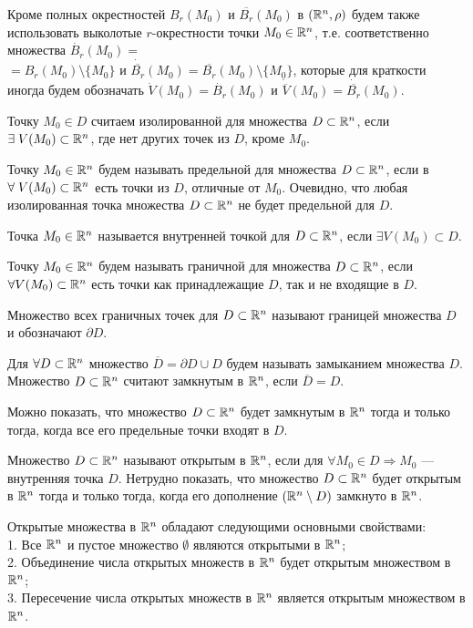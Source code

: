\begin{note}
	Кроме полных окрестностей $B_r(M_0)$ и $\overline{B_r}(M_0)$ в $(\mathbb{R}^n, \rho)$ будем также использовать выколотые $r$-окрестности точки $M_0 \in \mathbb{R}^n$, т.е. соответственно множества $\dot{B_r}(M_0) = $\\
	$ = B_r(M_0) \setminus \{M_0\}$ и $\dot{\overline{B_r}}(M_0) = \overline{B_r}(M_0) \setminus \{M_0\}$, которые для краткости иногда будем обозначать $\dot{V}(M_0) = \dot{B_r}(M_0)$ и $\dot{\overline{V}}(M_0) =\dot{\overline{B_r}}(M_0)$.
	
	Точку $M_0 \in D$ считаем изолированной для множества $D \subset \mathbb{R}^n$, если $ \exists \; V (M_0) \subset \mathbb{R}^n $, где нет других точек из $D$, кроме $M_0$.
	
	Точку $M_0 \in \mathbb{R}^n$ будем называть предельной для множества $D \subset \mathbb{R}^n$, если в $\forall \; V (M_0) \subset \mathbb{R}^n$ есть точки из $D$, отличные от $M_0$. Очевидно, что любая изолированная точка множества $D \subset \mathbb{R}^n$ не будет предельной для $D$.
	
	Точка $M_0 \in \mathbb{R}^n$ называется внутренней точкой для $D \subset \mathbb{R}^n$, если $\exists V (M_0) \subset D$.
	
	Точку $M_0 \in \mathbb{R}^n$ будем называть граничной для множества $D \subset \mathbb{R}^n$, если $\forall V (M_0) \subset \mathbb{R}^n$ есть точки как принадлежащие $D$, так и не входящие в $D$.
	
	Множество всех граничных точек для $D \subset \mathbb{R}^n$ называют границей множества $D$ и обозначают $\partial D$.
    
	Для $\forall D \subset \mathbb{R}^n$ множество $\overline{D} = \partial D \cup D$ будем называть замыканием множества $D$. Множество $D \subset \mathbb{R}^n$ считают замкнутым в $\mathbb{R}^n$, если $\overline{D} = D$.
\end{note}

Можно показать, что множество $D \subset \mathbb{R}^n$ будет замкнутым в $\mathbb{R}^n$ тогда и только тогда, когда все его предельные точки входят в $D$.

Множество $D \subset \mathbb{R}^n$ называют открытым в $\mathbb{R}^n$, если для $\forall M_0 \in D \Rightarrow M_0$ —  внутренняя точка $D$. Нетрудно показать, что множество $D \subset \mathbb{R}^n$ будет открытым в $\mathbb{R}^n$ тогда и только тогда, когда его дополнение $\left( \mathbb{R}^n \setminus D \right)$ замкнуто в $\mathbb{R}^n$.
	

Открытые множества в $\mathbb{R}^n$ обладают следующими основными свойствами:\\
1. Все $\mathbb{R}^n$ и пустое множество $\emptyset$ являются открытыми в $\mathbb{R}^n$;\\
2. Объединение  числа открытых множеств в $\mathbb{R}^n$ будет открытым множеством в $\mathbb{R}^n$;\\
3. Пересечение  числа открытых множеств в $\mathbb{R}^n$ является открытым множеством в $\mathbb{R}^n$.
\newpage

